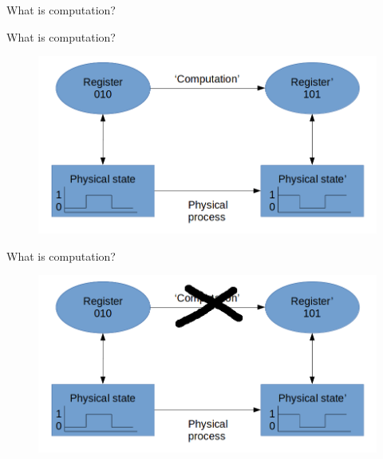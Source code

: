\documentclass[t]{beamer}
\begin{document}
\begin{frame}{What is computation?}

\end{frame}

\begin{frame}{What is computation?}

\begin{figure}
\includegraphics[scale=0.4]{dia1.png}
\end{figure}

\end{frame}


\begin{frame}{What is computation?}

\begin{figure}
\includegraphics[scale=0.4]{dia2.png}
\end{figure}

\end{frame}
\end{document}
